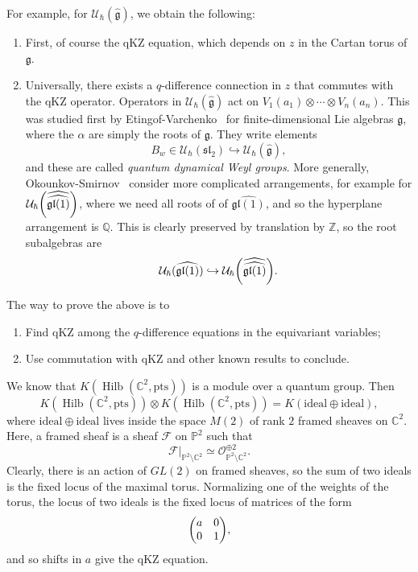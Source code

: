 \documentclass[leqno, openany]{memoir}
\theoremstyle{definition}
\theoremstyle{remark}
\theoremstyle{plain}
\theoremstyle{definition}
\theoremstyle{remark}
\newcommand{\C}{\mathbb{C}}
\newcommand{\Z}{\mathbb{Z}}
\newcommand{\Q}{\mathbb{Q}}
\renewcommand{\P}{\mathbb{P}}
\newcommand{\g}{\mathfrak{g}}
\newcommand{\mc}[1]{\mathcal{#1}}
\newcommand{\mf}[1]{\mathfrak{#1}}
\newcommand{\mr}[1]{\mathrm{#1}}
\newcommand{\wh}[1]{\widehat{#1}}
\DeclareMathOperator{\Hilb}{Hilb}
\begin{document}
For example, for $\mc{U}_{\hslash}(\wh{\mf{g}})$, we obtain the following:
\begin{enumerate}
    \item First, of course the qKZ equation, which depends on $z$ in the Cartan torus of $\mf{g}$.
    \item Universally, there exists a $q$-difference connection in $z$ that commutes with the qKZ operator. Operators in $\mc{U}_{\hslash}(\wh{\mf{g}})$ act on $V_1(a_1) \otimes \cdots \otimes V_n(a_n)$. This was studied first by Etingof-Varchenko~\cite{etvar} for finite-dimensional Lie algebras $\g$, where the $\alpha$ are simply the roots of $\mf{g}$. They write elements
        \[ B_w \in \mc{U}_{\hbar}(\mf{sl}_2) \hookrightarrow \mc{U}_{\hslash}(\wh{\g}), \]
        and these are called \textit{quantum dynamical Weyl groups}. More generally, Okounkov-Smirnov~\cite{qdenak} consider more complicated arrangements, for example for $\mc{U}_{\hslash}\qty(\wh{\wh{\mf{gl}(1)}})$, where we need all roots of of $\wh{\mf{gl}(1)}$, and so the hyperplane arrangement is $\Q$. This is clearly preserved by translation by $\Z$, so the root subalgebras are
        \[ \mc{U}_{\hslash}(\wh{\mf{gl}(1)}) \hookrightarrow \mc{U}_{\hslash}\qty(\wh{\wh{\mf{gl}(1)}}). \]
\end{enumerate}

The way to prove the above is to
\begin{enumerate}
    \item Find qKZ among the $q$-difference equations in the equivariant variables;
    \item Use commutation with qKZ and other known results to conclude.
\end{enumerate}

We know that $K(\Hilb(\C^2, \mr{pts}))$ is a module over a quantum group. Then
\[ K(\Hilb(\C^2, \mr{pts})) \otimes K(\Hilb(\C^2, \mr{pts})) = K(\mr{ideal} \oplus \mr{ideal}), \]
where $\mr{ideal} \oplus \mr{ideal}$ lives inside the space $M(2)$ of rank $2$ framed sheaves on $\C^2$. Here, a framed sheaf is a sheaf $\mc{F}$ on $\P^2$ such that 
\[ \mc{F}|_{\P^2 \setminus \C^2} \simeq \mc{O}_{\P^2\setminus \C^2}^{\oplus 2}. \]
Clearly, there is an action of $GL(2)$ on framed sheaves, so the sum of two ideals is the fixed locus of the maximal torus. Normalizing one of the weights of the torus, the locus of two ideals is the fixed locus of matrices of the form
\[ \mqty(a & 0 \\ 0 & 1), \]
and so shifts in $a$ give the qKZ equation.
\end{document}
